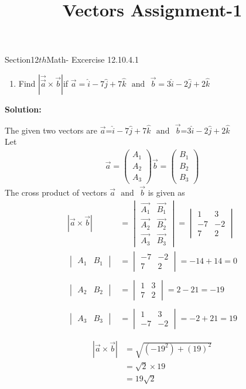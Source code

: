 \documentclass[12pt]{article}
\newcommand{\mydet}[1]{\ensuremath{\begin{vmatrix}#1\end{vmatrix}}}
\providecommand{\abs}[1]{\left\vert#1\right\vert}
\newcommand{\solution}{\noindent \textbf{Solution: }}
\newcommand{\myvec}[1]{\ensuremath{\begin{pmatrix}#1\end{pmatrix}}}
\begin{document}
\begin{center}\title{\textbf{Vectors Assignment-1}}
\date{\vspace{-5ex}}
\maketitle
\end{center}
Section{12${th}$Math- Excercise 12.10.4.1}

\begin{enumerate}
	\item Find $\abs{\vec{\vec{a}}\times\vec{b}}$if $\vec{a}=\hat{i}-7\hat{j}+7\hat{k}$ $\text{ and } $ $\vec{b}=3\hat{i}-2\hat{j}+2\hat{k}$
\end{enumerate}

\solution

The given two vectors are $\vec{a}$=$\hat{i}-7\hat{j}+7\hat{k}$  $\text{ and }$  $\vec{b}$=3$\hat{i}-2\hat{j}+2\hat{k}$ \\
 Let 
	\begin{align}
		\vec{a}=\myvec{A_1\\A_2\\A_3}
		\vec{b}=\myvec{B_1\\B_2\\B_3}
	\end{align}
The cross product of vectors $\vec{a}$ $\text{ and }$ $\vec{b}$ is given as
\begin{align}
	\abs{\vec{a}\times\vec{b}}&=\mydet{\vec{A_1}& \vec{B_1} \\ \vec{A_2} & \vec{B_2} \\ \vec{A_3}& \vec{B_3}}=\mydet{1 & 3\\ -7 & -2\\ 7 & 2} \\
\mydet{A_1&B_1}&=\mydet{-7 & -2 \\ 7 & 2}=-14+14=0\\\\
\mydet{A_2&B_2}&=\mydet{1 & 3 \\ 7 & 2}=2-21=-19\\\\
\mydet{A_3&B_3}&=\mydet{1 & 3 \\ -7 & -2}=-2+21=19\\\\
\end{align}
\begin{align}
	\abs{\vec{a}\times\vec{b}}&=\sqrt{(-19^2)+(19)^2}\\
&=\sqrt{2}\times19\\
&=19\sqrt{2}
\end{align}
\end{document}
